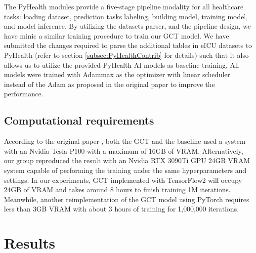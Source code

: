 \documentclass[11pt,a4paper]{article}
\begin{document}
The PyHealth modules provide a five-stage pipeline modality for all healthcare tasks: loading dataset, prediction tasks labeling, building model, training model, and model inference. By utilizing the datasets parser, and the pipeline design, we have minic a similar training procedure to train our GCT model. We have submitted the changes required to parse the additional tables in eICU datasets to PyHealth (refer to  section \ref{subsec:PyHealthContrib} for details) such that it also allows us to utilize the provided PyHealth AI models as baseline training. All models were trained with Adammax \citet{DBLP:journals/corr/KingmaB14} as the optimizer with linear scheduler instead of the Adam as proposed in the original paper to improve the performance.

\subsection{Computational requirements}
According to the original paper \citep{DBLP:conf/aaai/ChoiXLDFXD20}, both the GCT and the baseline used a system with an Nvidia Tesla P100 with a maximum of 16GB of VRAM. Alternatively, our group reproduced the result with an Nvidia RTX 3090Ti GPU 24GB VRAM system capable of performing the training under the same hyperparameters and settings. In our experiments, GCT implemented with TensorFlow2 will occupy 24GB of VRAM and takes around 8 hours to finish training 1M iterations. Meanwhile, another reimplementation of the GCT model using PyTorch requires less than 3GB VRAM with about 3 hours of training for 1,000,000 iterations.


\section{Results}


\end{document}
